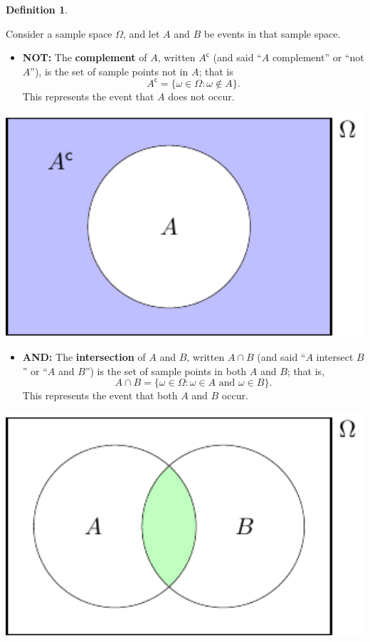 \documentclass[
  a4paper,
]{book}
\providecommand{\tightlist}{%
  \setlength{\itemsep}{0pt}\setlength{\parskip}{0pt}}
\theoremstyle{definition}
\newtheorem{definition}{Definition}[chapter]
\theoremstyle{definition}
\theoremstyle{definition}
\theoremstyle{remark}
\begin{document}
\begin{definition}
\protect\hypertarget{def:unlabeled-div-8}{}\label{def:unlabeled-div-8}

Consider a sample space \(\Omega\), and let \(A\) and \(B\) be events in that sample space.

\begin{itemize}
\tightlist
\item
  \textbf{NOT:} The \textbf{complement} of \(A\), written \(A^\mathsf{c}\) (and said ``\(A\) complement'' or ``not \(A\)''), is the set of sample points not in \(A\); that is
  \[ A^\mathsf{c}= \{\omega \in \Omega : \omega \not\in A \} . \]
  This represents the event that \(A\) does not occur.
\end{itemize}

\begin{center}\includegraphics[width=460pt]{math1710_files/figure-latex/venn-not-1} \end{center}

\begin{itemize}
\tightlist
\item
  \textbf{AND:} The \textbf{intersection} of \(A\) and \(B\), written \(A \cap B\) (and said ``\(A\) intersect \(B\)'' or ``\(A\) and \(B\)'') is the set of sample points in both \(A\) and \(B\); that is,
  \[ A \cap B = \{\omega \in \Omega : \omega \in A \text{ and } \omega \in B \} . \]
  This represents the event that both \(A\) and \(B\) occur.
\end{itemize}

\begin{center}\includegraphics[width=545pt]{math1710_files/figure-latex/venn-and-1} \end{center}


\end{definition}
\end{document}
